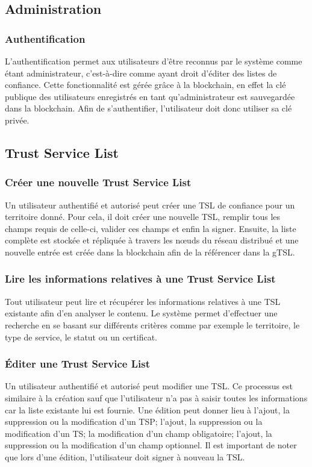 \documentclass{tnreport}
\begin{document}
\subsection{Administration}
\subsubsection{Authentification}
L'authentification permet aux utilisateurs d'être reconnus par le système comme étant administrateur, c'est-à-dire comme ayant droit d'éditer des listes de confiance. Cette fonctionnalité est gérée grâce à la blockchain, en effet la clé publique des utilisateurs enregistrés en tant qu'administrateur est sauvegardée dans la blockchain. Afin de s'authentifier, l'utilisateur doit donc utiliser sa clé privée.

\subsection{Trust Service List}
\label{sec:tsl}
\subsubsection{Créer une nouvelle Trust Service List}
Un utilisateur authentifié et autorisé peut créer une TSL de confiance pour un territoire donné. Pour cela, il doit créer une nouvelle TSL, remplir tous les champs requis de celle-ci, valider ces champs et enfin la signer. Ensuite, la liste complète est stockée et répliquée à travers les nœuds du réseau distribué et une nouvelle entrée est créée dans la blockchain afin de la référencer dans la gTSL.
\subsubsection{Lire les informations relatives à une Trust Service List}
Tout utilisateur peut lire et récupérer les informations relatives à une TSL existante afin d'en analyser le contenu. Le système permet d'effectuer une recherche en se basant sur différents critères comme par exemple le territoire, le type de service, le statut ou un certificat.
\subsubsection{Éditer une Trust Service List}
Un utilisateur authentifié et autorisé peut modifier une TSL. Ce processus est similaire à la création sauf que l'utilisateur n'a pas à saisir toutes les informations car la liste existante lui est fournie. Une édition peut donner lieu à l'ajout, la suppression ou la modification d'un TSP; l'ajout, la suppression ou la modification d'un TS; la modification d'un champ obligatoire; l'ajout, la suppression ou la modification d'un champ optionnel. Il est important de noter que lors d'une édition, l'utilisateur doit signer à nouveau la TSL.
\end{document}
